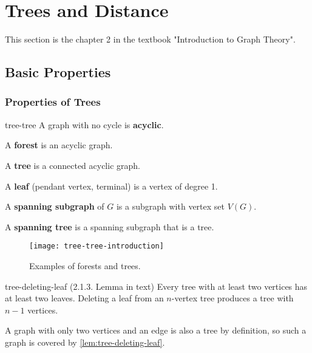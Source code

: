 \documentclass[../src/handouts/main.tex]{subfiles}
\begin{document}
\section{Trees and Distance}

This section is the chapter 2 in the textbook "Introduction to Graph Theory".




\subsection{Basic Properties}



\subsubsection{Properties of Trees}

\begin{definition}{}{tree-tree}
  A graph with no cycle is \textbf{acyclic}.

  A \textbf{forest} is an acyclic graph.

  A \textbf{tree} is a connected acyclic graph.

  A \textbf{leaf} (pendant vertex, terminal) is a vertex of degree 1.

  A \textbf{spanning subgraph} of $G$ is a subgraph with vertex set $V(G)$.

  A \textbf{spanning tree} is a spanning subgraph that is a tree.
\end{definition}

\begin{figure}[htbp]
  \centering
  \texttt{[image: tree-tree-introduction]}
  \caption{Examples of forests and trees.}
\end{figure}

\begin{lemma}{}{tree-deleting-leaf}
  (2.1.3. Lemma in text)
  Every tree with at least two vertices has at least two leaves.
  Deleting a leaf from an $n$-vertex tree produces a tree with $n-1$ vertices.
\end{lemma}

A graph with only two vertices and an edge is also a tree by definition, so such a graph is covered by \cref{lem:tree-deleting-leaf}.
\end{document}
